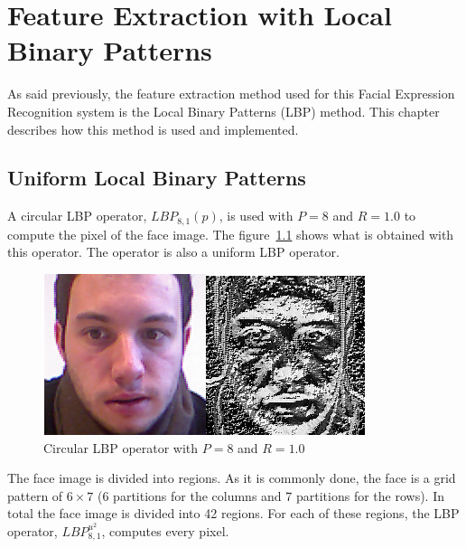 \chapter{Feature Extraction with Local Binary Patterns}
\label{chap:implementation_lbp}

\noindent As said previously, the feature extraction method used for this Facial Expression Recognition system is the Local Binary Patterns (LBP) method. This chapter describes how this method is used and implemented.
\newline

\section{Uniform Local Binary Patterns}

\vspace{\baselineskip}
\noindent A circular LBP operator, $ LBP_{8,1}(p) $, is used with $ P = 8 $ and $ R = 1.0 $ to compute the pixel of the face image. The figure~\ref{lbp_implementation_example} shows what is obtained with this operator. The operator is also a uniform LBP operator.
\newline

\begin{figure}[!h]
\begin{center}
\noindent \includegraphics[scale=0.8]{figures/lbp_implementation_example} 
\newline
\caption{Circular LBP operator with $ P = 8 $ and $ R = 1.0 $}
\label{lbp_implementation_example}
\end{center} 
\end{figure}

\noindent The face image is divided into regions. As it is commonly done, the face is a grid pattern of $ 6\times7 $ (6 partitions for the columns and 7 partitions for the rows). In total the face image is divided into 42 regions. For each of these regions, the LBP operator, $ LBP_{8,1}^{u^2} $, computes every pixel.
\newline

